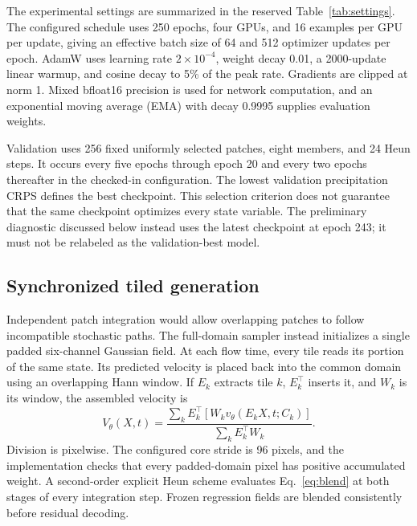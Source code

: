 \documentclass[10pt]{article}
\newcommand{\blankpanel}[1]{\begingroup\setlength{\fboxsep}{0pt}\color{rulegray}\fbox{\rule{0pt}{#1}\rule{\dimexpr\linewidth-2\fboxrule\relax}{0pt}}\endgroup}
\newcommand{\tableslot}[3]{\begin{table}[t]\caption{#2}\label{#3}\centering\blankpanel{#1}\end{table}}
\begin{document}
The experimental settings are summarized in the reserved Table~\ref{tab:settings}. The configured schedule uses 250 epochs, four GPUs, and 16 examples per GPU per update, giving an effective batch size of 64 and 512 optimizer updates per epoch. AdamW \citep{loshchilov2019} uses learning rate $2\times10^{-4}$, weight decay 0.01, a 2000-update linear warmup, and cosine decay to 5\% of the peak rate. Gradients are clipped at norm 1. Mixed bfloat16 precision is used for network computation, and an exponential moving average (EMA) with decay 0.9995 supplies evaluation weights.

Validation uses 256 fixed uniformly selected patches, eight members, and 24 Heun steps. It occurs every five epochs through epoch 20 and every two epochs thereafter in the checked-in configuration. The lowest validation precipitation CRPS defines the best checkpoint. This selection criterion does not guarantee that the same checkpoint optimizes every state variable. The preliminary diagnostic discussed below instead uses the latest checkpoint at epoch 243; it must not be relabeled as the validation-best model.

\tableslot{2.7cm}{Model and experimental settings. Reserved for the frozen regression provenance; target representations; local, halo, and context dimensions; network widths; optimizer and EMA settings; patch proposal; checkpoint selection; and validation/test sampler settings. Separate configured defaults from the settings recorded in the evaluated checkpoint and diagnostic archive. Table body intentionally blank.}{tab:settings}

\subsection{Synchronized tiled generation}
Independent patch integration would allow overlapping patches to follow incompatible stochastic paths. The full-domain sampler instead initializes a single padded six-channel Gaussian field. At each flow time, every tile reads its portion of the same state. Its predicted velocity is placed back into the common domain using an overlapping Hann window. If $E_k$ extracts tile $k$, $E_k^\top$ inserts it, and $W_k$ is its window, the assembled velocity is
\begin{equation}
V_\theta(X,t)=
\frac{\sum_k E_k^\top\!\left[W_kv_\theta(E_kX,t;C_k)\right]}
{\sum_k E_k^\top W_k}.
\label{eq:blend}
\end{equation}
Division is pixelwise. The configured core stride is 96 pixels, and the implementation checks that every padded-domain pixel has positive accumulated weight. A second-order explicit Heun scheme evaluates Eq.~\eqref{eq:blend} at both stages of every integration step. Frozen regression fields are blended consistently before residual decoding.
\end{document}
